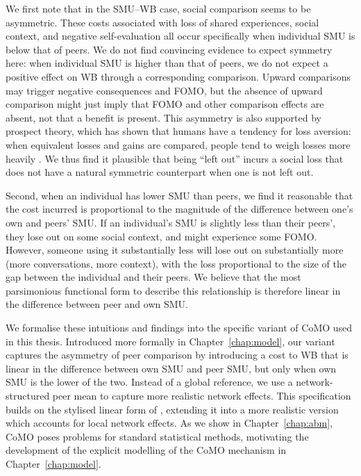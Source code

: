 We first note that in the SMU--WB case, social comparison seems to be asymmetric. These costs associated with loss of shared experiences, social context, and negative self-evaluation all occur specifically when individual SMU is below that of peers. We do not find convincing evidence to expect symmetry here: when individual SMU is higher than that of peers, we do not expect a positive effect on WB through a corresponding comparison. Upward comparisons may trigger negative consequences and FOMO, but the absence of upward comparison might just imply that FOMO and other comparison effects are absent, not that a benefit is present. This asymmetry is also supported by prospect theory, which has shown that humans have a tendency for loss aversion: when equivalent losses and gains are compared, people tend to weigh losses more heavily \parencite[p.~279]{KahnemanTversky1979}. We thus find it plausible that being ``left out'' incurs a social loss that does not have a natural symmetric counterpart when one is not left out.

Second, when an individual has lower SMU than peers, we find it reasonable that the cost incurred is proportional to the magnitude of the difference between one's own and peers' SMU\@. If an individual's SMU is slightly less than their peers', they lose out on some social context, and might experience some FOMO\@. However, someone using it substantially less will lose out on substantially more (more conversations, more context), with the loss proportional to the size of the gap between the individual and their peers. We believe that the most parsimonious functional form to describe this relationship is therefore linear in the difference between peer and own SMU\@.

We formalise these intuitions and findings into the specific variant of CoMO used in this thesis. Introduced more formally in Chapter~\ref{chap:model}, our variant captures the asymmetry of peer comparison by introducing a cost to WB that is linear in the difference between own SMU and peer SMU, but only when own SMU is the lower of the two. Instead of a global reference, we use a network-structured peer mean to capture more realistic network effects. This specification builds on the stylised linear form of \textcite[Eqs.~1--2]{DahlFoldnesGronneberg2024}, extending it into a more realistic version which accounts for local network effects. As we show in Chapter~\ref{chap:abm}, CoMO poses problems for standard statistical methods, motivating the development of the explicit modelling of the CoMO mechanism in Chapter~\ref{chap:model}.

